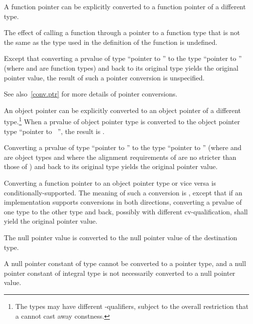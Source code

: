 \pnum
{}%
%
%
A function pointer can be explicitly converted
to a function pointer of a different type.
%
\begin{note}
The effect of calling a function through a pointer to a function
type that is not the same as the type used in the
definition of the function is undefined.
\end{note}
Except that converting
a prvalue of type ``pointer to '' to the type ``pointer to
'' (where  and  are function types) and
back to its original type yields the original pointer value, the result
of such a pointer conversion is unspecified.
\begin{note}
See also~\ref{conv.ptr} for more details of pointer conversions.
\end{note}

\pnum
An object pointer
can be explicitly converted to an object pointer of a different type.\footnote{The
types may have different \cv-qualifiers, subject to
the overall
restriction that a  cannot cast away constness.}
When a prvalue  of object pointer type is converted to
the object pointer type ``pointer to \cv{}~'', the result is .
\begin{note}
Converting a prvalue of type ``pointer to '' to
the type ``pointer to '' (where  and  are
object types and where the alignment requirements of  are no
stricter than those of ) and back to its original type yields
the original pointer value.
\end{note}

\pnum
Converting a function pointer to an object pointer
type or vice versa is
conditionally-supported. The meaning of such a conversion is
,
except that if an implementation
supports conversions in both directions, converting a prvalue of one type to the other
type and back, possibly with different cv-qualification, shall yield the original
pointer value.

\pnum
The null pointer value is converted to the null pointer value
of the destination type.
\begin{note}
A null pointer constant of type  cannot be converted to a
pointer type, and a null pointer constant of integral type is not necessarily
converted to a null pointer value.
\end{note}

